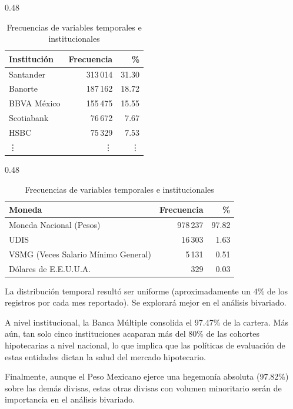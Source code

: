 \begin{table}[H]
	\begin{subtable}[t]{0.48\textwidth}
		\centering
		\caption{Institución}
		\begin{tabular}{lrr}
			\toprule
			\textbf{Institución} & \textbf{Frecuencia} & \textbf{\%} \\
			\midrule
			Santander & 313\,014 & 31.30 \\
			Banorte & 187\,162 & 18.72 \\
			BBVA México & 155\,475 & 15.55 \\
			Scotiabank & 76\,672 & 7.67 \\
			HSBC & 75\,329 & 7.53 \\
			\vdots & \vdots & \vdots \\
			\bottomrule
		\end{tabular}
	\end{subtable}
	\hfill
	\begin{subtable}[t]{0.48\textwidth}
		\centering
		\caption{Moneda}
		\begin{tabular}{p{4.5cm} r r}
			\toprule
			\textbf{Moneda} & \textbf{Frecuencia} & \textbf{\%} \\
			\midrule
			Moneda Nacional (Pesos) & 978\,237 & 97.82 \\
			UDIS & 16\,303 & 1.63 \\
			VSMG (Veces Salario Mínimo General) & 5\,131 & 0.51 \\
			Dólares de E.E.U.U.A. & 329 & 0.03 \\
			\bottomrule
		\end{tabular}
	\end{subtable}
	\caption{Frecuencias de variables temporales e institucionales}
	
\end{table}
La distribución temporal resultó ser uniforme (aproximadamente un 4\% de los registros por cada mes reportado). Se explorará mejor en el análisis bivariado.

A nivel institucional, la Banca Múltiple consolida el 97.47\% de la cartera. Más aún, tan solo cinco instituciones acaparan más del 80\% de las cohortes hipotecarias a nivel nacional, lo que implica que las políticas de evaluación de estas entidades dictan la salud del mercado hipotecario. 

Finalmente, aunque el Peso Mexicano ejerce una hegemonía absoluta (97.82\%) sobre las demás divisas, estas otras divisas con volumen minoritario serán de importancia en el análisis bivariado.


